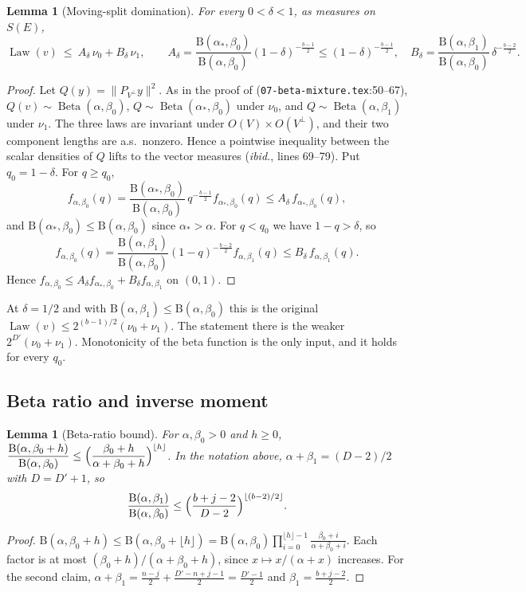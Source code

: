\documentclass[11pt]{article}
\newtheorem{lemma}[theorem]{Lemma}
\theoremstyle{definition}
\theoremstyle{remark}
\newcommand{\norm}[1]{\lVert #1\rVert}
\DeclareMathOperator{\Beta}{Beta}
\DeclareMathOperator{\Law}{Law}
\newcommand{\B}{\mathrm B}
\begin{document}
\begin{lemma}[Moving-split domination]\label{lem:moving}
For every \(0<\delta<1\), as measures on \(S(E)\),
\[
 \Law(v)\ \le\ A_\delta\,\nu_0+B_\delta\,\nu_1,\qquad
 A_\delta=\frac{\B(\alpha_*,\beta_0)}{\B(\alpha,\beta_0)}(1-\delta)^{-\frac{b-1}2}\le(1-\delta)^{-\frac{b-1}2},\quad
 B_\delta=\frac{\B(\alpha,\beta_1)}{\B(\alpha,\beta_0)}\,\delta^{-\frac{b-2}2}.
\]
\end{lemma}
\begin{proof}
Let \(Q(y)=\norm{P_{V^\perp}y}^2\). As in the proof of \cite[Lemma~5.1]{OAIsub}
(\texttt{07-beta-mixture.tex}:50--67), \(Q(v)\sim\Beta(\alpha,\beta_0)\),
\(Q\sim\Beta(\alpha_*,\beta_0)\) under \(\nu_0\), and \(Q\sim\Beta(\alpha,\beta_1)\)
under \(\nu_1\). The three laws are invariant under
\(O(V)\times O(V^\perp)\), and their two component lengths are a.s.\ nonzero. Hence a
pointwise inequality between the scalar densities of \(Q\) lifts to the vector
measures (\emph{ibid.}, lines 69--79). Put \(q_0=1-\delta\). For \(q\ge q_0\),
\[
 f_{\alpha,\beta_0}(q)=\frac{\B(\alpha_*,\beta_0)}{\B(\alpha,\beta_0)}\,q^{-\frac{b-1}2}f_{\alpha_*,\beta_0}(q)
 \le A_\delta\,f_{\alpha_*,\beta_0}(q),
\]
and \(\B(\alpha_*,\beta_0)\le\B(\alpha,\beta_0)\) since \(\alpha_*>\alpha\). For \(q<q_0\) we have \(1-q>\delta\), so
\[
 f_{\alpha,\beta_0}(q)=\frac{\B(\alpha,\beta_1)}{\B(\alpha,\beta_0)}(1-q)^{-\frac{b-2}2}f_{\alpha,\beta_1}(q)
 \le B_\delta\,f_{\alpha,\beta_1}(q).
\]
Hence \(f_{\alpha,\beta_0}\le A_\delta f_{\alpha_*,\beta_0}+B_\delta f_{\alpha,\beta_1}\) on \((0,1)\).
\end{proof}
At \(\delta=1/2\) and with \(\B(\alpha,\beta_1)\le\B(\alpha,\beta_0)\) this is the original
\(\Law(v)\le 2^{(b-1)/2}(\nu_0+\nu_1)\). The statement there is the weaker \(2^{D'}(\nu_0+\nu_1)\).
Monotonicity of the beta function is the only input, and it holds for every \(q_0\).

\subsection{Beta ratio and inverse moment}

\begin{lemma}[Beta-ratio bound]\label{lem:betaratio}
For \(\alpha,\beta_0>0\) and \(h\ge0\),
\(\displaystyle\frac{\B(\alpha,\beta_0+h)}{\B(\alpha,\beta_0)}\le\Bigl(\frac{\beta_0+h}{\alpha+\beta_0+h}\Bigr)^{\lfloor h\rfloor}\).
In the notation above, \(\alpha+\beta_1=(D-2)/2\) with \(D=D'+1\), so
\[
 \frac{\B(\alpha,\beta_1)}{\B(\alpha,\beta_0)}\le\Bigl(\frac{b+j-2}{D-2}\Bigr)^{\lfloor (b-2)/2\rfloor}.
\]
\end{lemma}
\begin{proof}
\(\B(\alpha,\beta_0+h)\le\B(\alpha,\beta_0+\lfloor h\rfloor)=\B(\alpha,\beta_0)\prod_{i=0}^{\lfloor h\rfloor-1}\frac{\beta_0+i}{\alpha+\beta_0+i}\).
Each factor is at most \((\beta_0+h)/(\alpha+\beta_0+h)\), since \(x\mapsto x/(\alpha+x)\) increases.
For the second claim, \(\alpha+\beta_1=\frac{n-j}2+\frac{D'-n+j-1}2=\frac{D'-1}2\) and \(\beta_1=\frac{b+j-2}2\).
\end{proof}
\end{document}
